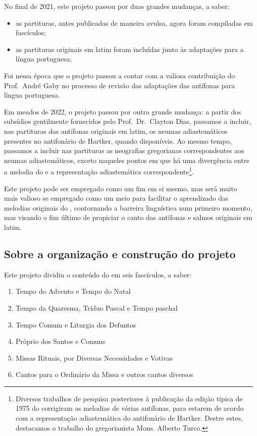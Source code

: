 No final de 2021, este projeto passou por duas grandes mudanças, a saber:
\begin{itemize}
  \item as partituras, antes publicadas de maneira avulsa, agora foram compiladas em fascículos;

  \item as partituras originais em latim foram incluídas junto às adaptações para a língua portuguesa;
\end{itemize}
Foi nessa época que o projeto passou a contar com a valiosa contribuição do Prof.~André Gaby no processo de revisão das adaptações das antífonas para língua portuguesa.

Em meados de 2022, o projeto passou por outra grande mudança: a partir dos subsídios gentilmente fornecidos pelo Prof.~Dr.~Clayton Dias, passamos a incluir, nas partituras das antífonas originais em latim, os neumas adiastemáticos presentes no antifonário de Hartker, quando disponíveis. Ao mesmo tempo, passamos a incluir nas partituras as neografias gregorianas correspondentes aos neumas adiastemáticos, exceto naqueles pontos em que há uma divergência entre a melodia do {\GS} e a representação adiastemática correspondente\footnote{Diversos trabalhos de pesquisa posteriores à publicação da edição típica de 1975 do {\GS} corrigiram as melodias de várias antífonas, para estarem de acordo com a representação adiastemática do antifonário de Hartker. Destre estes, destacamos o trabalho do gregorianista Mons. Alberto Turco.}.

Este projeto pode ser empregado como um fim em si mesmo, mas será muito mais valioso se empregado como um meio para facilitar o aprendizado das melodias originais do {\GS}, contornando a barreira linguística num primeiro momento, mas visando o fim último de propiciar o canto das antífonas e salmos originais em latim.

\subsection{Sobre a organização e construção do projeto}

Este projeto dividiu o conteúdo do {\GS} em seis fascículos, a saber:
\begin{enumerate}[I:]
  \item Tempo do Advento e Tempo do Natal
  \item Tempo da Quaresma, Tríduo Pascal e Tempo paschal
  \item Tempo Comum e Liturgia dos Defuntos
  \item Próprio dos Santos e Comuns
  \item Missas Rituais, por Diversas Necessidades e Votivas
  \item Cantos para o Ordinário da Missa e outros cantos diversos
\end{enumerate}

